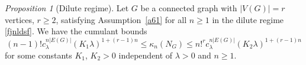 \documentclass[bj,authoryear,noshowframe]{imsart}
\theoremstyle{plain}
\theoremstyle{remark}
\newtheorem{prop}{Proposition}[section]
\begin{document}
  \vspace{-0.2cm}
 
 \begin{prop}[Dilute regime]
 \label{t1}
 Let $G$ be a connected graph with $|V(G)| = r$ vertices, $r\geq 2$, 
 satisfying
 Assumption~\ref{a61} for all $n\geq 1$
 in the dilute regime \eqref{fjnldsf}. 
   We have the cumulant bounds 
 \begin{equation}
 \label{equiv-1}
  (n-1)! c_\lambda^{n |E(G)| } ( K_1 \lambda )^{1+(r-1)n}
  \leq 
  \kappa_n(N_G)
  \leq 
  n!^r c_\lambda^{n |E(G) |} ( K_2 \lambda )^{1+(r-1)n} 
 \end{equation}
 for some constants $K_1$, $K_2>0$ independent of $\lambda>0$ and $n\geq 1$.
 \end{prop} 
\end{document}
